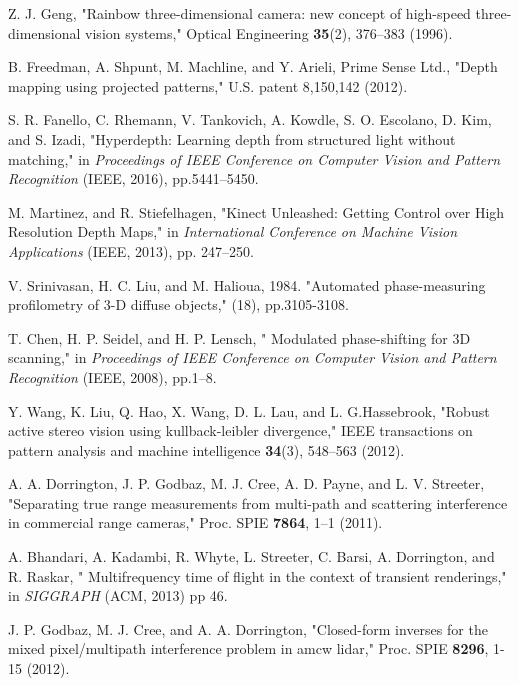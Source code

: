 \documentclass[10pt]{article}
\begin{document}
\begin{thebibliography}{99}
  Z. J. Geng, "Rainbow three\--dimensional camera: new concept of high\--speed three\--dimensional vision systems," Optical Engineering  {\bfseries 35}(2), 376--383 (1996).

 B. Freedman, A. Shpunt, M. Machline,  and Y. Arieli, Prime Sense Ltd., "Depth mapping using projected patterns," U.S. patent 8,150,142 (2012).

 S. R. Fanello, C. Rhemann, V. Tankovich, A. Kowdle,  S. O. Escolano, D. Kim, and  S. Izadi, "Hyperdepth: Learning depth from structured light without matching," in {\itshape Proceedings of IEEE Conference on Computer Vision and Pattern Recognition} (IEEE, 2016), pp.5441--5450.

 M. Martinez, and R. Stiefelhagen, "Kinect Unleashed: Getting Control over High Resolution Depth Maps," in {\itshape International Conference on Machine Vision Applications} (IEEE, 2013), pp. 247--250.

  V. Srinivasan, H. C. Liu,  and  M. Halioua, 1984. "Automated phase-measuring profilometry of 3-D diffuse objects," (18), pp.3105-3108.

 T. Chen, H. P. Seidel,  and  H. P. Lensch, " Modulated phase-shifting for 3D scanning," in {\itshape Proceedings of IEEE Conference on Computer Vision and Pattern Recognition} (IEEE, 2008), pp.1--8.

 Y. Wang, K. Liu, Q. Hao, X. Wang, D. L. Lau,  and  L. G.Hassebrook,  "Robust active stereo vision using kullback\--leibler divergence," IEEE transactions on pattern analysis and machine intelligence {\bfseries 34}(3), 548--563 (2012).

 A. A. Dorrington, J. P. Godbaz,  M. J. Cree, A. D. Payne, and  L. V. Streeter,  "Separating true range measurements from multi-path and scattering interference in commercial range cameras," Proc. SPIE {\bfseries 7864}, 1--1 (2011).

 A. Bhandari, A. Kadambi, R. Whyte, L. Streeter,  C. Barsi, A. Dorrington,  and R. Raskar, "
Multifrequency time of flight in the context of transient renderings,"  in {\itshape SIGGRAPH} (ACM, 2013) pp 46.

 J. P. Godbaz,   M. J. Cree, and A. A. Dorrington,  "Closed-form inverses for the mixed pixel/multipath interference problem in amcw lidar," Proc. SPIE {\bfseries 8296}, 1-15 (2012).


\end{thebibliography}
\end{document}
